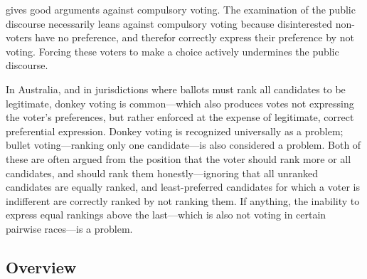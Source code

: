 \autocite{Swenson2007} gives good arguments against compulsory voting.  The examination of the public discourse necessarily leans against compulsory voting because disinterested non-voters have no preference, and therefor correctly express their preference by not voting.  Forcing these voters to make a choice actively undermines the public discourse.

In Australia, and in jurisdictions where ballots must rank all candidates to be legitimate, donkey voting is common—which also produces votes not expressing the voter's preferences, but rather enforced at the expense of legitimate, correct preferential expression.  Donkey voting is recognized universally as a problem; bullet voting—ranking only one candidate—is also considered a problem.  Both of these are often argued from the position that the voter should rank more or all candidates, and should rank them honestly—ignoring that all unranked candidates are equally ranked, and least-preferred candidates for which a voter is indifferent are correctly ranked by not ranking them.  If anything, the inability to express equal rankings above the last—which is also not voting in certain pairwise races—is a problem.

\subsection{Overview}

